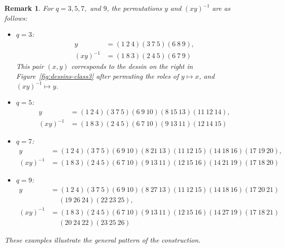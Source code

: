 \documentclass[12pt,reqno]{amsart}
\newcommand{\q}{\quad}									%
\theoremstyle{mythmstyle}
\theoremstyle{mydefstyle}
\newtheorem{rem}[lemma]{Remark}
\newcommand{\figref}[1]{Figure~\ref{#1}}
\numberwithin{equation}{section}
\begin{document}
\begin{rem}
For $q = 3, 5, 7,$ and $9$, the permutations $y$ and $(xy)^{-1}$ are as follows:
\begin{itemize}
\item $q=3$:
\begin{align}
y&=(1\ 2\ 4)(3\ 7\ 5)(6\ 8\ 9), \\
(xy)^{-1}&=(1\ 8\ 3)(2\ 4\ 5)(6\ 7\ 9)
\end{align}
This pair $(x,y)$ corresponds to the dessin on the right in \figref{fig:dessins-class3} after permuting the roles of
$y \mapsto x$, and $(xy)^{-1}\mapsto y$.
\item $q=5$:
\begin{align}
y&=(1\ 2\ 4)(3\ 7\ 5)(6\ 9\ 10)(8\ 15\ 13)(11\ 12\ 14), \\
(xy)^{-1}&=(1\ 8\ 3)(2\ 4\ 5)(6\ 7\ 10)(9\ 13\ 11)(12\ 14\ 15)
\end{align}
\item $q=7$:
\begin{align}
y&=(1\ 2\ 4)(3\ 7\ 5)(6\ 9\ 10)(8\ 21\ 13)(11\ 12\ 15)(14\ 18\ 16)(17\ 19\ 20), \\
(xy)^{-1}&=(1\ 8\ 3)(2\ 4\ 5)(6\ 7\ 10)(9\ 13\ 11)(12\ 15\ 16)(14\ 21\ 19)(17\ 18\ 20)
\end{align}
\item $q=9$:
\begin{align}
y &= (1\ 2\ 4)(3\ 7\ 5)(6\ 9\ 10)(8\ 27\ 13)(11\ 12\ 15)(14\ 18\ 16)(17\ 20\ 21) \\
&\q\ (19\ 26\ 24)(22\ 23\ 25), \\
(xy)^{-1}&= (1\ 8\ 3)(2\ 4\ 5)(6\ 7\ 10)(9\ 13\ 11)(12\ 15\ 16)(14\ 27\ 19)(17\ 18\ 21) \\
&\q\ (20\ 24\ 22)(23\ 25\ 26)
\end{align}
\end{itemize}
These examples illustrate the general pattern of the construction.
\end{rem}
\end{document}
